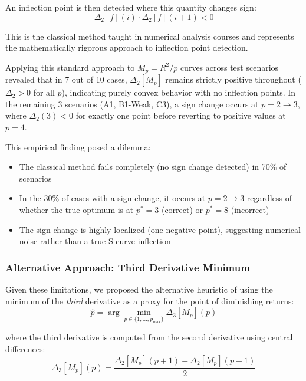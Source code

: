 \documentclass[11pt,a4paper]{article}
\begin{document}
An inflection point is then detected where this quantity changes sign:
\begin{equation}
\Delta_2[f](i) \cdot \Delta_2[f](i+1) < 0
\label{eq:classic_inflection}
\end{equation}

This is the classical method taught in numerical analysis courses and represents the mathematically rigorous approach to inflection point detection.

Applying this standard approach to $M_p = R^2/p$ curves across test scenarios revealed that in 7 out of 10 cases, $\Delta_2[M_p]$ remains strictly positive throughout ($\Delta_2 > 0$ for all $p$), indicating purely convex behavior with no inflection points. In the remaining 3 scenarios (A1, B1-Weak, C3), a sign change occurs at $p = 2 \to 3$, where $\Delta_2(3) < 0$ for exactly one point before reverting to positive values at $p = 4$.

This empirical finding posed a dilemma:
\begin{itemize}
\item The classical method fails completely (no sign change detected) in 70\% of scenarios
\item In the 30\% of cases with a sign change, it occurs at $p = 2 \to 3$ regardless of whether the true optimum is at $p^* = 3$ (correct) or $p^* = 8$ (incorrect)
\item The sign change is highly localized (one negative point), suggesting numerical noise rather than a true S-curve inflection
\end{itemize}

\subsubsection{Alternative Approach: Third Derivative Minimum}

Given these limitations, we proposed the alternative heuristic of using the minimum of the \emph{third} derivative as a proxy for the point of diminishing returns:
\begin{equation}
\hat{p} = \arg\min_{p \in \{1,\ldots,p_{\max}\}} \Delta_3[M_p](p)
\label{eq:selection_rule}
\end{equation}

where the third derivative is computed from the second derivative using central differences:
\begin{equation}
\Delta_3[M_p](p) = \frac{\Delta_2[M_p](p+1) - \Delta_2[M_p](p-1)}{2}
\label{eq:third_deriv}
\end{equation}
\end{document}
